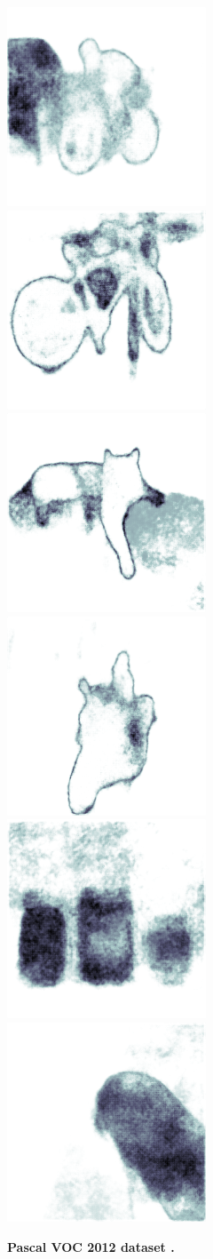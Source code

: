 \begin{figure}[p]
\begin{center}
{\includegraphics[height=0.125\linewidth]{BayesianSegNet/segnet_bayes_00202_uncertainty.png}
\includegraphics[height=0.125\linewidth]{BayesianSegNet/segnet_bayes_00147_uncertainty.png}
\includegraphics[height=0.125\linewidth]{BayesianSegNet/segnet_bayes_00148_uncertainty.png}
\includegraphics[height=0.125\linewidth]{BayesianSegNet/segnet_bayes_00166_uncertainty.png}
\includegraphics[height=0.125\linewidth]{BayesianSegNet/segnet_bayes_00017_uncertainty.png}
\includegraphics[height=0.125\linewidth]{BayesianSegNet/segnet_bayes_00023_uncertainty.png}
}
\end{center}
\caption[Bayesian SegNet results on the Pascal VOC dataset.]{\footnotesize \textbf{Pascal VOC 2012 dataset \citep{pascal}.}}
\label{fig:qual_pascal}
\end{figure}

